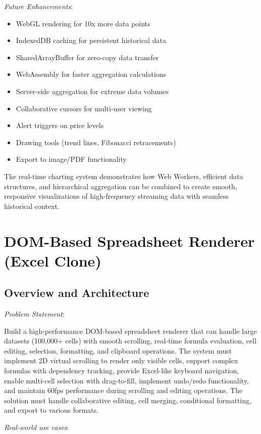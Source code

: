 \documentclass[11pt]{article}
\begin{document}
\emph{Future Enhancements}:

\begin{itemize}
\item WebGL rendering for 10x more data points
\item IndexedDB caching for persistent historical data
\item SharedArrayBuffer for zero-copy data transfer
\item WebAssembly for faster aggregation calculations
\item Server-side aggregation for extreme data volumes
\item Collaborative cursors for multi-user viewing
\item Alert triggers on price levels
\item Drawing tools (trend lines, Fibonacci retracements)
\item Export to image/PDF functionality
\end{itemize}

The real-time charting system demonstrates how Web Workers, efficient data structures, and hierarchical aggregation can be combined to create smooth, responsive visualizations of high-frequency streaming data with seamless historical context.
\section{DOM-Based Spreadsheet Renderer (Excel Clone)}
\label{sec:orgeda273d}

\subsection{Overview and Architecture}
\label{sec:org09e9593}

\emph{Problem Statement}:

Build a high-performance DOM-based spreadsheet renderer that can handle large datasets (100,000+ cells) with smooth scrolling, real-time formula evaluation, cell editing, selection, formatting, and clipboard operations. The system must implement 2D virtual scrolling to render only visible cells, support complex formulas with dependency tracking, provide Excel-like keyboard navigation, enable multi-cell selection with drag-to-fill, implement undo/redo functionality, and maintain 60fps performance during scrolling and editing operations. The solution must handle collaborative editing, cell merging, conditional formatting, and export to various formats.

\emph{Real-world use cases}:
\end{document}
